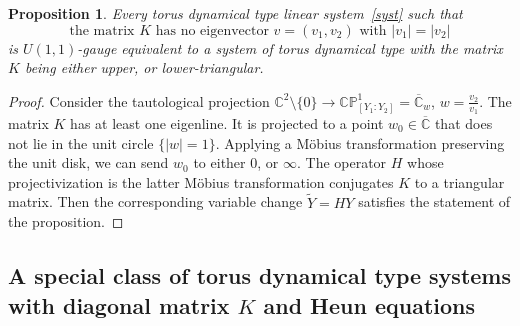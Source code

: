 \documentclass[preprint,12pt]{elsarticle}
\theoremstyle{plain}
\newtheorem{proposition}[theorem]{Proposition}
\def\wt#1{\widetilde#1}
\numberwithin{equation}{section}
\numberwithin{equation}{section}
\begin{document}
\begin{proposition} Every torus dynamical type linear system~\eqref{syst} such that 
\begin{equation} \text{the matrix } K \text{ has no eigenvector } v=(v_1,v_2) \text{ with } |v_1|=|v_2|\label{eigen}
\end{equation}
is $U(1,1)$-gauge equivalent to a system of torus dynamical type with 
the matrix $K$ being either upper, or lower-triangular. 
\end{proposition}
\begin{proof} Consider the tautological projection $\mathbb{C}^2\setminus\{0\}\to\mathbb{CP}^1_{[Y_1:Y_2]}=\overline{\mathbb{C}}_w$, 
$w=\frac{v_2}{v_1}$. The matrix $K$ has at least one eigenline. It is projected to a point $w_0\in\overline{\mathbb{C}}$ 
 that does not lie in the unit circle $\{|w|=1\}$. 
Applying a M\"obius transformation preserving the unit disk, we can send $w_0$ to either $0$, or $\infty$. 
The   operator $H$ whose projectivization is the latter M\"obius 
transformation conjugates $K$ to a triangular matrix. Then the corresponding variable change 
$\wt Y=HY$ satisfies the statement of the proposition.
\end{proof}

\subsection{A special class of  torus dynamical type systems with diagonal matrix \texorpdfstring{$K$}{K} and Heun equations}\label{subsec:spec-case}
\end{document}
